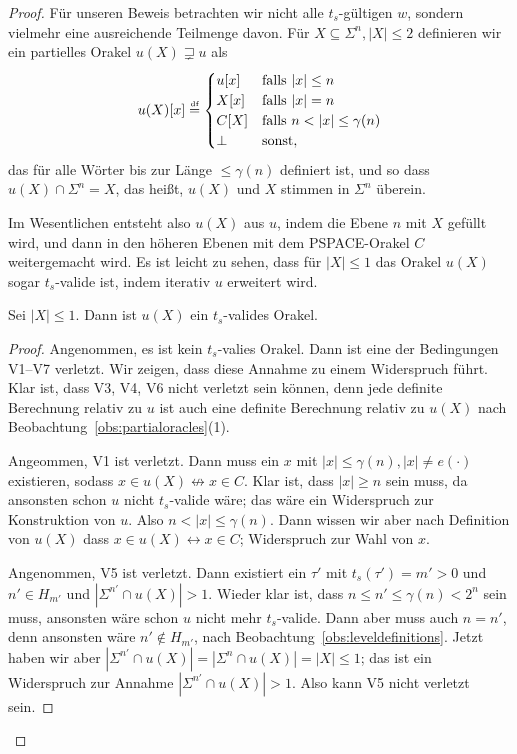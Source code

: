 \begin{proof}
Für unseren Beweis betrachten wir nicht alle $t_{s}$-gültigen $w$, sondern vielmehr eine ausreichende Teilmenge davon.
Für $X \subseteq \Sigma^n, |X|\leq 2$ definieren wir ein partielles Orakel $u(X)\sqsupsetneq u$ als
\[
    u(X)[x] \defeq \begin{cases} u[x] & \text{falls $|x|\leq n$}\\
    X[x] & \text{falls $|x|=n$}\\
    C[X] & \text{falls $n<|x|\leq \gamma(n)$} \\ \bot & \text{sonst}, \end{cases}
\]
das für alle Wörter bis zur Länge $\leq\gamma(n)$ definiert ist, und so dass $u(X) \cap \Sigma^n = X$, das heißt, $u(X)$ und $X$ stimmen in $\Sigma^n$ überein.

Im Wesentlichen entsteht also $u(X)$ aus $u$, indem die Ebene $n$ mit $X$ gefüllt wird, und dann in den höheren Ebenen mit dem PSPACE-Orakel $C$ weitergemacht wird.
Es ist leicht zu sehen, dass für $|X|\leq 1$ das Orakel $u(X)$ sogar $t_{s}$-valide ist, indem iterativ $u$ erweitert wird.

\begin{claim}\label{claim:myoracle-validty-leq1}
    Sei $|X|\leq 1$. Dann ist $u(X)$ ein $t_{s}$-valides Orakel.
\end{claim}
\begin{proof}
    Angenommen, es ist kein $t_{s}$-valies Orakel. Dann ist eine der Bedingungen V1--V7 verletzt. Wir zeigen, dass diese Annahme zu einem Widerspruch führt.
    Klar ist, dass V3, V4, V6 nicht verletzt sein können, denn jede definite Berechnung relativ zu $u$ ist auch eine definite Berechnung relativ zu $u(X)$ nach Beobachtung~\ref{obs:partialoracles}(1).

    Angeommen, V1 ist verletzt. Dann muss ein $x$ mit $|x|\leq \gamma(n), |x|\neq e(\cdot)$ existieren, sodass $x\in u(X) \not\leftrightarrow x\in C$.
    Klar ist, dass $|x|\geq n$ sein muss, da ansonsten schon $u$ nicht $t_{s}$-valide wäre; das wäre ein Widerspruch zur Konstruktion von $u$.
    Also $n<|x|\leq \gamma(n)$. Dann wissen wir aber nach Definition von $u(X)$ dass $x\in u(X) \leftrightarrow x\in C$; Widerspruch zur Wahl von $x$.

    Angenommen, V5 ist verletzt. Dann existiert ein $\tau'$ mit $t_{s}(\tau')=m'>0$ und $n'\in H_{m'}$ und $|\Sigma^{n'}\cap u(X)|>1$. Wieder klar ist, dass $n\leq n'\leq\gamma(n)<2^n$ sein muss, ansonsten wäre schon $u$ nicht mehr $t_{s}$-valide.
    Dann aber muss auch $n=n'$, denn ansonsten wäre $n'\not\in H_{m'}$, nach Beobachtung~\ref{obs:leveldefinitions}.
    Jetzt haben wir aber $|\Sigma^{n'}\cap u(X)|=|\Sigma^n\cap u(X)| = |X|\leq 1$; das ist ein Widerspruch zur Annahme $|\Sigma^{n'}\cap u(X)|>1$. Also kann V5 nicht verletzt sein. 


\end{proof}
\end{proof}
